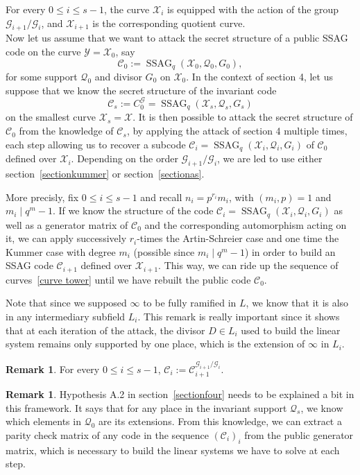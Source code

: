 \documentclass[10pt]{article}
\theoremstyle{definition}
\newtheorem{rq1}[thm]{Remark}
\theoremstyle{definition}
\theoremstyle{definition}
\newcommand{\C}{\mathcal{C}}
\newcommand{\X}{\mathcal{X}}
\newcommand{\Y}{\mathcal{Y}}
\newcommand{\QR}{\mathcal{Q}}
\newcommand{\G}{\mathcal{G}}
\newcommand{\ssag}{\operatorname{SSAG}}
\begin{document}
For every $0 \leq i \leq s-1$, the curve $\X_i$ is equipped with the action of the group $\G_{i+1}/\G_i$, and $\X_{i+1}$ is the corresponding quotient curve. \\
Now let us assume that we want to attack the secret structure of a public SSAG code on the curve $\Y=\X_0$, say
\[\C_0 := \ssag_q(\X_0,\QR_0,G_0),\]
for some support $\QR_0$ and divisor $G_0$ on $\X_0$. In the context of section 4, let us suppose that we know the secret structure of the invariant code 
\[\C_s:= C_0^{\G} = \ssag_q(\X_s,\QR_s,G_s)\]
on the smallest curve $\X_s=\X$. It is then possible to attack the secret structure of $\C_0$ from the knowledge of $\C_s$, by applying the attack of section 4 multiple times, each step allowing us to recover a subcode $\C_i=\ssag_q(\X_i,\QR_i,G_i)$ of $\C_0$ defined over $\X_i$. Depending on the order $\G_{i+1}/\G_i$, we are led to use either section~\ref{sectionkummer} or section~\ref{sectionas}.

 More precisly, fix $0 \leq i \leq s-1$ and recall $n_i = p^{r_i}m_i$, with $(m_i,p)=1$ and $m_i \mid q^m-1$. If we know the structure of the code $\C_i = \ssag_q(\X_i,\QR_i,G_i)$ as well as a generator matrix of $\C_0$ and the corresponding automorphism acting on it, we can apply successively $r_i$-times the Artin-Schreier case and one time the Kummer case with degree $m_i$ (possible since $m_i \mid q^m-1$) in order to build an SSAG code $\C_{i+1}$ defined over $\X_{i+1}$. This way, we can ride up the sequence of curves~\eqref{curve tower} until we have rebuilt the public code $\C_0$. 

 
 Note that since we supposed $\infty$ to be fully ramified in $L$, we know that it is also in any intermediary subfield $L_i$. This remark is really important since it shows that at each iteration of the attack, the divisor $D \in L_i$ used to build the linear system remains only supported by one place, which is the extension of $\infty$ in $L_i$.


\begin{rq1}
For every $0 \leq i \leq s-1$, $\C_i := \C_{i+1}^{\G_{i+1}/\G_i}$. 
\end{rq1}

\begin{rq1} \label{induced permutation} Hypothesis A.2 in section~\ref{sectionfour} needs to be explained a bit in this framework. It says that for any place in the invariant support $\QR_s$, we know which elements in $\QR_0$ are its extensions. From this knowledge, we can extract a parity check matrix of any code in the sequence $(\C_i)_i$ from the public generator matrix, which is necessary to build the linear systems we have to solve at each step. 
\end{rq1}
\end{document}

